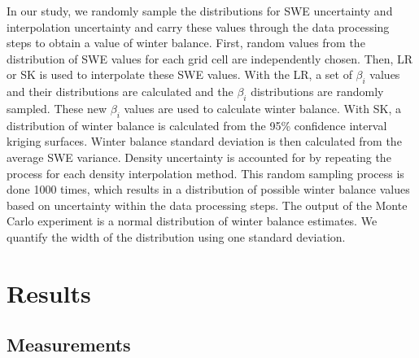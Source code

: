 \documentclass[review,oneside, letterpaper]{igs}
\begin{document}
In our study, we randomly sample the distributions for SWE uncertainty and interpolation uncertainty and carry these values through the data processing steps to obtain a value of winter balance. First, random values from the distribution of SWE values for each grid cell are independently chosen. Then, LR or SK is used to interpolate these SWE values. With the LR, a set of $\beta_i$ values and their distributions are calculated and the $\beta_i$ distributions are randomly sampled. These new $\beta_i$ values are used to calculate winter balance. With SK, a distribution of winter balance is calculated from the 95\% confidence interval kriging surfaces. Winter balance standard deviation is then calculated from the average SWE variance. Density uncertainty is accounted for by repeating the process for each density interpolation method. This random sampling process is done 1000 times, which results in a distribution of possible winter balance values based on uncertainty within the data processing steps. The output of the Monte Carlo experiment is a normal distribution of winter balance estimates. We quantify the width of the distribution using one standard deviation.

\section{Results}

\subsection{Measurements}
\end{document}
